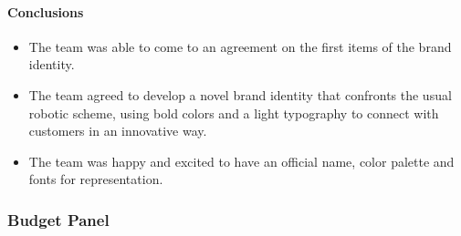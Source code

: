\documentclass{article}
\begin{document}
\paragraph{Conclusions}
\begin{itemize}
    \item The team was able to come to an agreement on the first items of the brand identity.
    \item The team agreed to develop a novel brand identity that confronts the usual robotic scheme, using bold colors and a light typography to connect with customers in an innovative way.
    \item The team was happy and excited to have an official name, color palette and fonts for representation. 
    
\end{itemize}

\subsubsection{Budget Panel}
\end{document}
